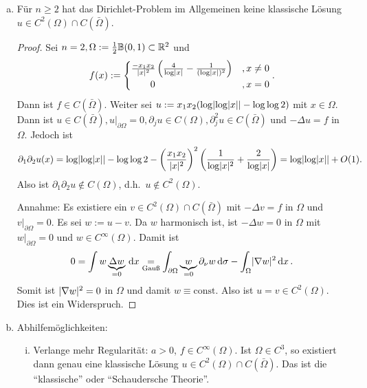 \begin{bem}
  \label{bem:7.14}
  \begin{enumerate}[(a)]
  \item \label{bem:7.14-1} Für $n\geq2$ hat das Dirichlet-Problem im Allgemeinen keine klassische Lösung $u\in C^2(\Omega)\cap C(\bar\Omega)$.
    \begin{proof}
      Sei $n=2, \Omega:=\frac 12\mathbb{B}(0,1)\subset\mathbb{R}^2$ und 
       \begin{align*}
        f(x):=\begin{cases}
           \frac{-x_1x_2}{\lvert x\rvert^2}\left(\frac 4{\log\lvert x\rvert}-\frac 1{(\log\lvert x\rvert)^2}\right) &,x\neq 0 \\
           \qquad 0 &,x=0
         \end{cases}.
       \end{align*}
       Dann ist $f\in C(\bar\Omega)$. Weiter sei $u:=x_1x_2(\log\lvert \log\lvert x\rvert\rvert-\log\log 2)$ mit $x\in\Omega$. Dann ist $u\in C(\bar\Omega), u\rvert_{\partial\Omega}=0, \partial_ju\in C(\Omega), \partial_j^2 u\in C(\bar\Omega)$ und $-\Delta u=f$ in $\Omega$. Jedoch ist
       \begin{dmath*}
         \partial_1\partial_2u(x)=\log\abs{\log\abs x}-\log\log 2-
         \left(\frac{x_1x_2}{\abs x^2}\right)^2
         \left(\frac1{\log\abs x^2}+\frac2{\log\abs x}\right)
         =\log\abs{\log\abs x}+O(1).
       \end{dmath*}
       Also ist $\partial_1\partial_2u\notin C(\Omega)$, d.h.\ $u\notin C^2(\Omega)$.
   

     Annahme: Es existiere ein $v\in C^2(\Omega)\cap C(\bar\Omega)$ mit  $-\Delta v=f$ in $\Omega$ und $v\rvert_{\partial\Omega}=0$. Es sei $w:=u-v$. Da $w$ harmonisch ist, ist $-\Delta w=0$ in $\Omega$ mit $w\rvert_{\partial\Omega}=0$ und $w\in C^\infty(\Omega)$. Damit ist
     \[
      0=\int w\underbrace{\Delta w}_{=0}\,\mathrm{d} x\underset{\scriptsize\text{Gauß}}=\int_{\partial\Omega}\underbrace{w}_{=0}\partial_\nu w\,\mathrm{d}\sigma-\int_\Omega\lvert \nabla w\rvert^2\,\mathrm{d} x\, .
      \]
      Somit ist $\lvert \nabla w\rvert^2=0$ in $\Omega$ und damit $w\equiv\text{const}$. Also ist $u=v\in C^2(\Omega)$. Dies ist ein Widerspruch.
        \end{proof}

  \item \label{bem:7.14-2} Abhilfemöglichkeiten:
    \begin{enumerate}[(i)]
    \item Verlange mehr Regularität: $a>0$, $f\in C^\infty(\Omega)$. Ist $\Omega\in C^3$, so existiert dann genau eine klassische Lösung $u\in C^2(\Omega)\cap C(\bar\Omega)$. Das ist die "`klassische"' oder "`Schaudersche Theorie"'. 
      

\end{enumerate}
\end{enumerate}
\end{bem}
